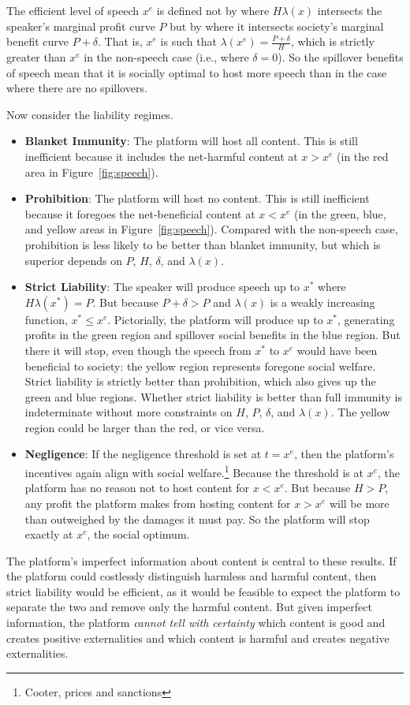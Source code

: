 The efficient level of speech $x^e$ is defined not by where $H\lambda(x)$ intersects the speaker's marginal profit curve $P$ but by where it intersects society's marginal benefit curve $P+\delta$. That is, $x^e$ is such that $\lambda(x^e) = \frac{P+\delta}{H}$, which is strictly greater than $x^e$ in the non-speech case (i.e., where $\delta=0$). So the spillover benefits of speech mean that it is socially optimal to host more speech than in the case where there are no spillovers.

Now consider the liability regimes.
\begin{itemize}
    \item \textbf{Blanket Immunity}: The platform will host all content. This is still inefficient because it includes the net-harmful content at $x > x^e$ (in the red area in Figure~\ref{fig:speech}).
     \item \textbf{Prohibition}: The platform will host no content. This is still inefficient because it foregoes the net-beneficial content at $x < x^e$ (in the green, blue, and yellow areas in Figure~\ref{fig:speech}). Compared with the non-speech case, prohibition is less likely to be better than blanket immunity, but which is superior depends on $P$, $H$, $\delta$, and $\lambda(x)$.
     \item \textbf{Strict Liability}: The speaker will produce speech up to $x^*$ where $H\lambda(x^*) = P$. But because $P + \delta > P$ and $\lambda(x)$ is a weakly increasing function, $x^* \le x^e$. Pictorially, the platform will produce up to $x^*$, generating profits in the green region and spillover social benefits in the blue region. But there it will stop, even though the speech from $x^*$ to $x^e$ would have been beneficial to society: the yellow region represents foregone social welfare. Strict liability is strictly better than prohibition, which also gives up the green and blue regions. Whether strict liability is better than full immunity is indeterminate without more constraints on $H$, $P$, $\delta$, and $\lambda(x)$. The yellow region could be larger than the red, or vice versa.
     \item \textbf{Negligence}: If the negligence threshold is set at $t=x^e$, then the platform's incentives again align with social welfare.\footnote{Cooter, prices and sanctions} Because the threshold is at $x^e$, the platform has no reason not to host content for $x < x^e$. But because $H > P$, any profit the platform makes from hosting content for $x >  x^e$ will be more than outweighed by the damages it must pay. So the platform will stop exactly at $x^e$, the social optimum.
\end{itemize} 
The platform's imperfect information about content is central to these results. If the platform could costlessly distinguish harmless and harmful content, then strict liability would be efficient, as it would be feasible to expect the platform to separate the two and remove only the harmful content. But given imperfect information, the platform \emph{cannot tell with certainty} which content is good and creates positive externalities and which content is harmful and creates negative externalities. 


